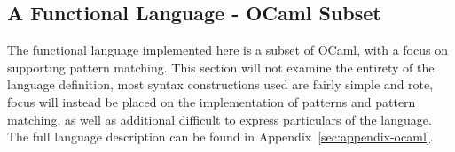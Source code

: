 \documentclass{kththesis}
\begin{document}



\subsection{A Functional Language - OCaml Subset} \label{sec:functional-eval}

The functional language implemented here is a subset of OCaml, with a focus on supporting pattern matching. This section will not examine the entirety of the language definition, most syntax constructions used are fairly simple and rote, focus will instead be placed on the implementation of patterns and pattern matching, as well as additional difficult to express particulars of the language. The full language description can be found in Appendix~\ref{sec:appendix-ocaml}.
\end{document}
